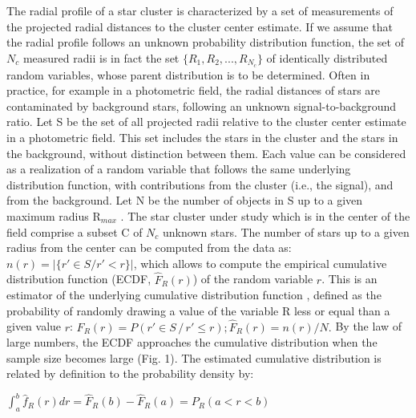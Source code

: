 \documentclass[11pt,twoside
]{article}
\begin{document}
The radial profile of a star cluster is characterized by a set of
measurements of the projected radial distances to the cluster center
estimate. If we assume that the radial profile follows an unknown
probability distribution function, the set of $N_c$ measured radii is
in fact the set $\{R_1, R_2, ..., R_{N_c}\}$ of identically
distributed random variables, whose parent distribution is to be
determined. Often in practice, for example in a photometric field, the
radial distances of stars are contaminated by background stars,
following an unknown signal-to-background ratio. Let S be the set of
all projected radii relative to the cluster center estimate in a
photometric field. This set includes the stars in the cluster and the
stars in the background, without distinction between them. Each value
can be considered as a realization of a random variable that follows
the same underlying distribution function, with contributions from the
cluster (i.e., the signal), and from the background. Let N be the
number of objects in S up to a given maximum radius R$_{max}$ . The star
cluster under study which is in the center of the field comprise a
subset C of $N_c$ unknown stars. The number of stars up to a given
radius from the center can be computed from the data as: $n(r) = |\{r'
\in S / r' < r\}|$, which allows to compute the empirical cumulative
distribution function (ECDF, $\hat{F}_R(r)$) of the random variable
$r$.
%
This is an estimator of the underlying cumulative distribution
function , defined as the probability of randomly drawing a value of
the variable R less or equal than a given value $r$:
\(\displaystyle   F_R(r)  =   P( {r' \in S \, / \, r' \le r} );
\hat{F}_R(r) = n(r) / N.  \)
%
By the law of large numbers, the ECDF approaches the cumulative
distribution when the sample size becomes large (Fig. 1).
%
The estimated cumulative distribution is related by definition to the
probability density by:

\(\displaystyle   \int_a^b \hat{f}_R(r) dr = \hat{F}_R(b) - \hat{F}_R(a) = P_R(a<r<b)  \)
\end{document}
